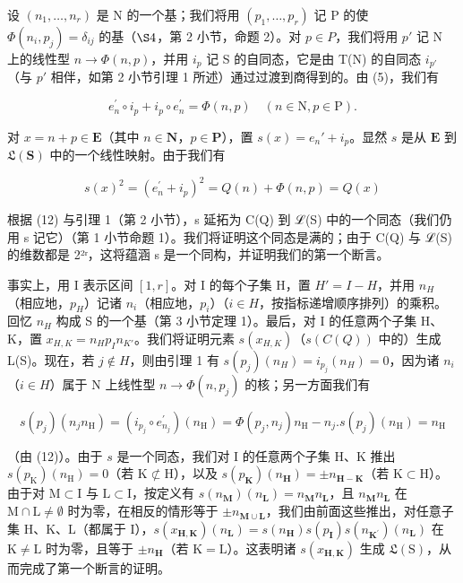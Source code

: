   设 \((n_{1},\ldots,n_{r})\) 是 N 的一个基；我们将用 \((p_{1},\ldots,p_{r})\) 记 P 的使 \(\Phi(n_{i},p_{j})=\delta_{ij}\) 的基（\(\S 4\)，第 2 小节，命题 2）。对 \(p\in P\)，我们将用 \(p'\) 记 N 上的线性型 \(n\to\Phi(n,p)\)，并用 \(i_{p}\) 记 S 的自同态，它是由 T(N) 的自同态 \(i_{p'}\)（与 \(p'\) 相伴，如第 2 小节引理 1 所述）通过过渡到商得到的。由 (5)，我们有

\[
e _ {n} ^ {\prime} \circ i _ {p} + i _ {p} \circ e _ {n} ^ {\prime} = \Phi (n, p) \quad (n \in \mathrm{N}, p \in \mathrm{P}).\tag{12}
\]

  对 \(x = n + p \in \mathbf{E}\)（其中 \(n \in \mathbf{N}\)，\(p \in \mathbf{P}\)），置 \(s(x) = e_n' + i_p\)。显然 \(s\) 是从 \(\mathbf{E}\) 到 \(\mathfrak{L}(\mathbf{S})\) 中的一个线性映射。由于我们有

\[
s (x) ^ {2} = \left(e _ {n} ^ {\prime} + i _ {p}\right) ^ {2} = Q (n) + \Phi (n, p) = Q (x)
\]

  根据 (12) 与引理 1（第 2 小节），s 延拓为 C(Q) 到 ℒ(S) 中的一个同态（我们仍用 s 记它）（第 1 小节命题 1）。我们将证明这个同态是满的；由于 C(Q) 与 ℒ(S) 的维数都是 2²ʳ，这将蕴涵 s 是一个同构，并证明我们的第一个断言。

  事实上，用 I 表示区间 \([1, r]\)。对 I 的每个子集 H，置 \(H' = I - H\)，并用 \(n_{H}\)（相应地，\(p_{H}\)）记诸 \(n_{i}\)（相应地，\(p_{i}\)）（\(i \in H\)，按指标递增顺序排列）的乘积。回忆 \(n_{H}\) 构成 S 的一个基（第 3 小节定理 1）。最后，对 I 的任意两个子集 H、K，置 \(x_{H,K} = n_{H}p_{I}n_{K'}\)。我们将证明元素 \(s(x_{H,K})\)（\(s(C(Q))\) 中的）生成 L(S)。现在，若 \(j \notin H\)，则由引理 1 有 \(s(p_{j})(n_{H}) = i_{p_{j}}(n_{H}) = 0\)，因为诸 \(n_{i}\)（\(i \in H\)）属于 N 上线性型 \(n \to \Phi(n, p_{j})\) 的核；另一方面我们有

\[
s \left(p _ {j}\right) \left(n _ {j} n _ {\mathrm{H}}\right) = \left(i _ {p _ {j}} \circ e _ {n _ {j}} ^ {\prime}\right) \left(n _ {\mathrm{H}}\right) = \Phi \left(p _ {j}, n _ {j}\right) n _ {\mathrm{H}} - n _ {j}. s \left(p _ {j}\right) \left(n _ {\mathrm{H}}\right) = n _ {\mathrm{H}}
\]

（由 (12)）。由于 \(s\) 是一个同态，我们对 I 的任意两个子集 H、K 推出 \(s(p_{\mathrm{K}})(n_{\mathrm{H}}) = 0\)（若 \(\mathrm{K} \not\subset \mathrm{H}\)），以及 \(s(p_{\mathbf{K}}) (n_{\mathbf{H}}) = \pm n_{\mathbf{H} - \mathbf{K}}\)（若 \(\mathrm{K} \subset \mathrm{H}\)）。由于对 \(\mathrm{M} \subset \mathrm{I}\) 与 \(\mathrm{L} \subset \mathrm{I}\)，按定义有 \(s(n_{\mathbf{M}})(n_{\mathbf{L}}) = n_{\mathbf{M}}n_{\mathbf{L}}\)，且 \(n_{\mathbf{M}}n_{\mathbf{L}}\) 在 \(\mathrm{M} \cap \mathrm{L} \neq \emptyset\) 时为零，在相反的情形等于 \(\pm n_{\mathbf{M} \cup \mathbf{L}}\)，我们由前面这些推出，对任意子集 \(\mathrm{H}\)、\(\mathrm{K}\)、\(\mathrm{L}\)（都属于 \(\mathrm{I}\)），\(s(x_{\mathbf{H},\mathbf{K}})(n_{\mathbf{L}}) = s(n_{\mathbf{H}})s(p_{\mathbf{I}})s(n_{\mathbf{K}^{\prime}})(n_{\mathbf{L}})\) 在 \(\mathrm{K} \neq \mathrm{L}\) 时为零，且等于 \(\pm n_{\mathbf{H}}\)（若 \(\mathrm{K} = \mathrm{L}\)）。这表明诸 \(s(x_{\mathbf{H},\mathbf{K}})\) 生成 \(\mathfrak{L}(\mathrm{S})\)，从而完成了第一个断言的证明。


